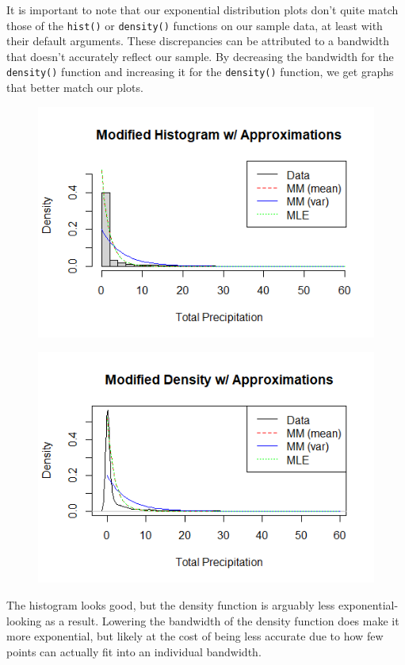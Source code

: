 \documentclass[12pt, a4paper, oneside]{report}
\begin{document}
\newpage
It is important to note that our exponential distribution plots don't quite match those of the \lstinline{hist()} or \lstinline{density()} functions on our sample data, at least with their default arguments. These discrepancies can be attributed to a bandwidth that doesn't accurately reflect our sample. 
By decreasing the bandwidth for the \lstinline{density()} function and increasing it for the \lstinline{density()} function, we get graphs that better match our plots.



\begin{figure}[h]
  \centering
  \includegraphics[width=0.8\linewidth]{expHistModifiedA.png}
\end{figure}

\begin{figure}[h]
  \centering
  \includegraphics[width=0.8\linewidth]{expDensityModifiedA.png}
\end{figure}

\newpage
The histogram looks good, but the density function is arguably less exponential-looking as a result. Lowering the bandwidth of the density function does make it more exponential, but likely at the cost of being less accurate due to how few points can actually fit into an individual bandwidth. 
\end{document}
